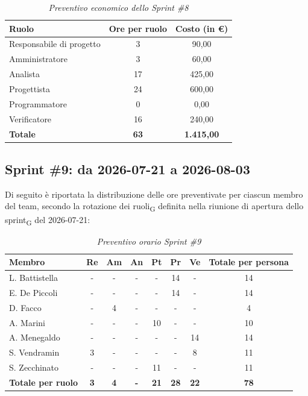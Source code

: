 ﻿\documentclass[a4paper, 10pt, colorlinks=true, linkcolor=black, urlcolor=blue, citecolor=blue, hidelinks]{article}
\renewcommand{\arraystretch}{1.2}
\begin{document}
\begin{table}[H]
    \centering
    \renewcommand{\arraystretch}{1.4}
    \begin{tabular}{|l|c|c|}
        \hline
        \rowcolor{bluBitless!15}
        \textbf{Ruolo} & \textbf{Ore per ruolo} & \textbf{Costo (in €)} \\
        \hline
        Responsabile di progetto & 3 & 90,00 \\ \hline
        Amministratore & 3 & 60,00 \\ \hline
        Analista & 17 & 425,00 \\ \hline
        Progettista & 24 & 600,00 \\ \hline
        Programmatore & 0 & 0,00 \\ \hline
        Verificatore & 16 & 240,00 \\ \hline
        \rowcolor{bluBitless!8}
        \textbf{Totale} & \textbf{63} & \textbf{1.415,00} \\ \hline
    \end{tabular}
    \caption{\textit{Preventivo economico dello Sprint \#8}}
\end{table}

\subsection{Sprint \#9: da 2026-07-21 a 2026-08-03}
Di seguito è riportata la distribuzione delle ore preventivate per ciascun membro del team, secondo la rotazione dei ruoli\textsubscript{G} definita nella riunione di apertura dello sprint\textsubscript{G} del 2026-07-21:

\begin{table}[H]
    \centering
    \renewcommand{\arraystretch}{1.4}
    \begin{tabular}{|l|c|c|c|c|c|c|c|}
        \hline
        \rowcolor{bluBitless!15}
        \textbf{Membro} & \textbf{Re} & \textbf{Am} & \textbf{An} & \textbf{Pt} & \textbf{Pr} & \textbf{Ve} & \textbf{Totale per persona} \\
        \hline
        L. Battistella & - & - & - & - & 14 & - & 14 \\ \hline
        E. De Piccoli & - & - & - & - & 14 & - & 14 \\ \hline
        D. Facco & - & 4 & - & - & - & - & 4 \\ \hline
        A. Marini & - & - & - & 10 & - & - & 10 \\ \hline
        A. Menegaldo & - & - & - & - & - & 14 & 14 \\ \hline
        S. Vendramin & 3 & - & - & - & - & 8 & 11 \\ \hline
        S. Zecchinato & - & - & - & 11 & - & - & 11 \\ \hline
        \rowcolor{bluBitless!8}
        \textbf{Totale per ruolo} & \textbf{3} & \textbf{4} & \textbf{-} & \textbf{21} & \textbf{28} & \textbf{22} & \textbf{78} \\
        \hline
    \end{tabular}
    \caption{\textit{Preventivo orario Sprint \#9}}
\end{table}
\end{document}
